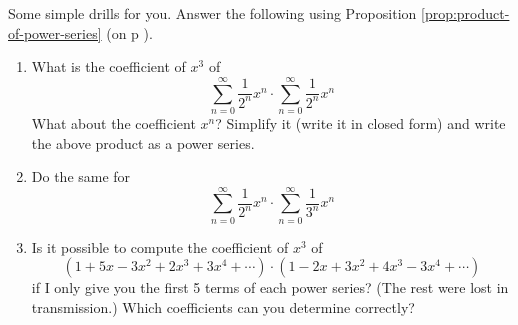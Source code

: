 
Some simple drills for you.
Answer the following using Proposition \ref{prop:product-of-power-series}
(on p \pageref{prop:product-of-power-series}).
\begin{enumerate}[nosep,label=(\alph*)]
\item 
What is the coefficient of $x^3$ of
\[
\sum_{n = 0}^\infty \frac{1}{2^n} x^n \cdot \sum_{n = 0}^\infty \frac{1}{2^n} x^n
\]
What about the coefficient $x^n$? Simplify it (write it in closed form) and
write the above product as a power series.
\item Do the same for 
\[
\sum_{n = 0}^\infty \frac{1}{2^n} x^n \cdot \sum_{n = 0}^\infty \frac{1}{3^n} x^n
\]
\item Is it possible to compute the coefficient of $x^3$ of
\[
(1 + 5x - 3x^2 + 2x^3 + 3x^4 + \cdots) \cdot (1 - 2x + 3x^2 + 4x^3 - 3x^4 + \cdots) 
\]
if I only give you the first 5 terms of each power series? (The rest were lost in transmission.)
Which coefficients can you determine correctly?
\end{enumerate}

